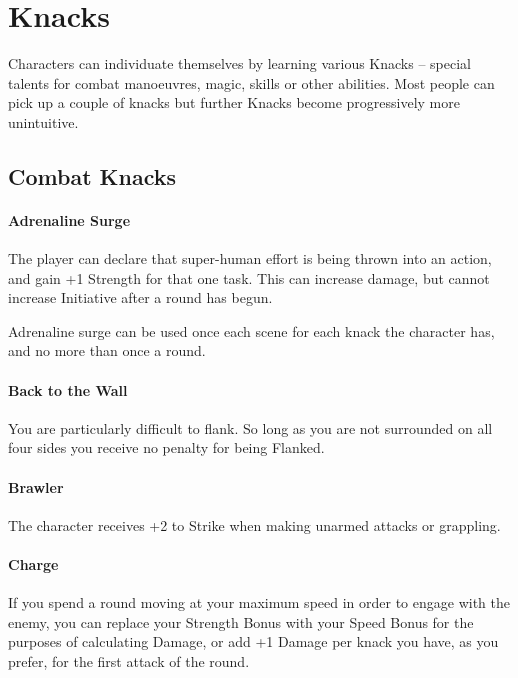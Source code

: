\documentclass[titlepage,a4paper,openany]{book}
\begin{document}
\chapter{Knacks}\label{knacks}

Characters can individuate themselves by learning various Knacks -- special talents for combat manoeuvres, magic, skills or other abilities. Most people can pick up a couple of knacks but further Knacks become progressively more unintuitive.

\section{Combat Knacks}

\begin{multicols}{2}

\subsubsection{Adrenaline Surge}

The player can declare that super-human effort is being thrown into an action, and gain +1 Strength for that one task.  This can increase damage, but cannot increase Initiative after a \gls{round} has begun.

Adrenaline surge can be used once each scene for each knack the character has, and no more than once a \gls{round}.

\subsubsection{Back to the Wall}

You are particularly difficult to flank. So long as you are not surrounded on all four sides you receive no penalty for being Flanked.

\subsubsection{Brawler}

The character receives +2 to Strike when making unarmed attacks or grappling.

\subsubsection{Charge}

If you spend a \gls{round} moving at your maximum speed in order to engage with the enemy, you can replace your Strength Bonus with your Speed Bonus for the purposes of calculating Damage, or add +1 Damage per knack you have, as you prefer, for the first attack of the \gls{round}.


\end{multicols}
\end{document}
